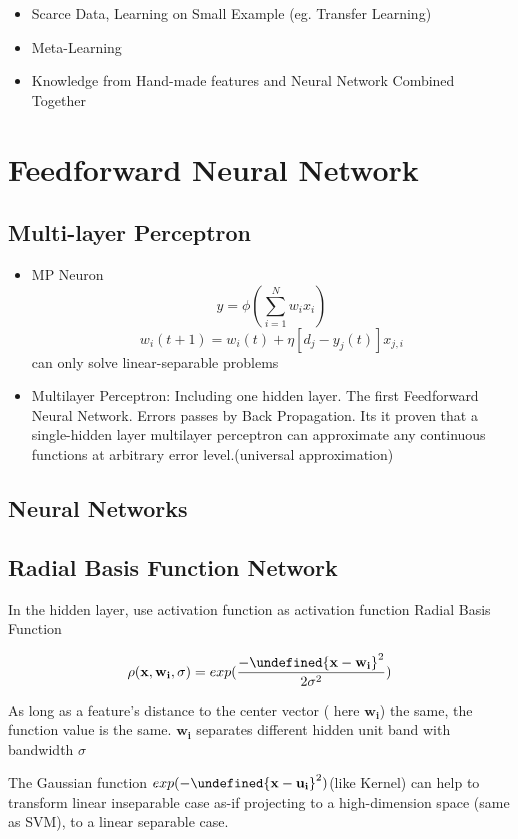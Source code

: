 \documentclass[11pt, openany]{book}              %
\let\norm\undefined %
\DeclarePairedDelimiter\norm{\lVert}{\rVert}
\begin{document}
\begin{itemize}
	\item Scarce Data, Learning on Small Example (eg. Transfer Learning)
	\item Meta-Learning
	\item Knowledge from Hand-made features and Neural Network Combined Together 
\end{itemize}


\chapter{Feedforward Neural Network}
\section{Multi-layer Perceptron}

\begin{itemize}
    \item MP Neuron $$y = \phi(\sum_{i=1}^N w_ix_i)$$ $$w_i(t+1) = w_i(t) + \eta [d_j-y_j(t)]x_{j,i}$$ can only solve linear-separable problems
    \item Multilayer Perceptron: Including one hidden layer. The first Feedforward Neural Network. Errors passes by Back Propagation. Its it proven that a single-hidden layer multilayer perceptron can approximate any continuous functions at arbitrary error level.(universal approximation)
\end{itemize}

\section{Neural Networks}

\section{Radial Basis Function Network}

In the hidden layer, use activation function as activation function 
Radial Basis Function

$$ \rho(\mathbf{x,w_i},\sigma) = exp(\frac{ -{\norm{ \mathbf{x} - \mathbf{w_i} }}^2}{2\sigma^2})$$

As long as a feature's distance to the center vector ( here $\mathbf{w_i}$) the same, the function value is the same. $\mathbf{w_i}$ separates different hidden unit band with bandwidth $\sigma$ 

The Gaussian function $exp(-\norm{\mathbf{x} - \mathbf{u_i}}^2)$(like Kernel) can help to transform linear inseparable case as-if projecting to a high-dimension space (same as SVM), to a linear separable case.
\end{document}
